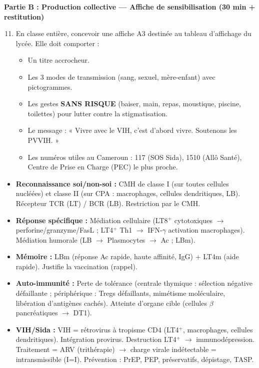 \documentclass[11pt]{article}
\newcounter{popsec}
\newcounter{popsub}
\newcommand{\courssub}[1]{%
  \stepcounter{popsub}%
  \par\vspace{9pt}\noindent{\popxbold\fontsize{11.5}{13}\selectfont\color{popink}{\color{poporange}\thepopsec.\thepopsub}\hspace{6pt}#1}\par\nopagebreak\vspace{4pt}
}
\begin{document}
\textbf{Partie B : Production collective — Affiche de sensibilisation (30 min + restitution)}
\begin{enumerate}
    \setcounter{enumi}{10}
    \item En classe entière, concevoir une affiche A3 destinée au tableau d'affichage du lycée. Elle doit comporter :
    \begin{itemize}
        \item Un titre accrocheur.
        \item Les 3 modes de transmission (sang, sexuel, mère-enfant) avec pictogrammes.
        \item Les gestes \textbf{SANS RISQUE} (baiser, main, repas, moustique, piscine, toilettes) pour lutter contre la stigmatisation.
        \item Le message : « Vivre avec le VIH, c'est d'abord vivre. Soutenons les PVVIH. »
        \item Les numéros utiles au Cameroun : 117 (SOS Sida), 1510 (Allô Santé), Centre de Prise en Charge (PEC) le plus proche.
    \end{itemize}
\end{enumerate}

\courssub{Ressources à mobiliser}
\begin{itemize}
    \item \textbf{Reconnaissance soi/non-soi :} CMH de classe I (sur toutes cellules nucléées) et classe II (sur CPA : macrophages, cellules dendritiques, LB). Récepteur TCR (LT) / BCR (LB). Restriction par le CMH.
    \item \textbf{Réponse spécifique :} Médiation cellulaire (LT8$^+$ cytotoxiques $\rightarrow$ perforine/granzyme/FasL ; LT4$^+$ Th1 $\rightarrow$ IFN-$\gamma$ activation macrophages). Médiation humorale (LB $\rightarrow$ Plasmocytes $\rightarrow$ Ac ; LBm).
    \item \textbf{Mémoire :} LBm (réponse Ac rapide, haute affinité, IgG) + LT4m (aide rapide). Justifie la vaccination (rappel).
    \item \textbf{Auto-immunité :} Perte de tolérance (centrale thymique : sélection négative défaillante ; périphérique : Tregs défaillants, mimétisme moléculaire, libération d'antigènes cachés). Atteinte d'organe cible (cellules $\beta$ pancréatiques $\rightarrow$ DT1).
    \item \textbf{VIH/Sida :} VIH = rétrovirus à tropisme CD4 (LT4$^+$, macrophages, cellules dendritiques). Intégration provirus. Destruction LT4$^+$ $\rightarrow$ immunodépression. Traitement = ARV (trithérapie) $\rightarrow$ charge virale indétectable = intransmissible (I=I). Prévention : PrEP, PEP, préservatifs, dépistage, TASP.
\end{itemize}
\end{document}
